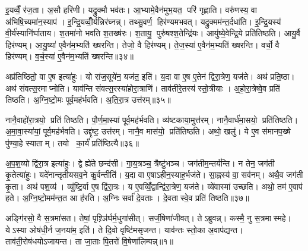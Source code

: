 इ॒यव्वैँ॒ र॑ज॒ता। अ॒सौ हरि॑णी। यद्रु॒क्मौ भव॑तः। आ॒भ्यामे॒वैन॑मुभ॒यत॒ परि॑ गृह्णाति। वरु॑णस्य॒ वा अ॑भिषि॒च्यमा॑न॒स्याप॑। इ॒न्द्रि॒यव्वीँ॒र्य॑न्निर॑घ्नन्न्। तथ्सु॒वर्ण॒ हिर॑ण्यमभवत्। यद्रु॒क्मम॑न्त॒र्दधा॑ति। इ॒न्द्रि॒यस्य॑ वी॒र्य॑स्यानि॑र्घाताय। श॒तमा॑नो भवति श॒तख्ष॑रः। श॒तायु॒ पुरु॑षश्श॒तेन्द्रि॑यः। आयु॑ष्ये॒वेन्द्रि॒ये प्रति॑तिष्ठति। आयु॒र्वै हिर॑ण्यम्। आ॒यु॒ष्या॑ ए॒वैन॑म॒भ्यति॑ ख्षरन्ति। तेजो॒ वै हिर॑ण्यम्। ते॒ज॒स्या॑ ए॒वैन॑म॒भ्यति॑ ख्षरन्ति। वर्चो॒ वै हिर॑ण्यम्। व॒र्च॒स्या॑ ए॒वैन॑म॒भ्यति॑ ख्षरन्ति॥३४॥\anuvakamend[श॒तख्ष॑रो॒ऽष्टौ च॑]

अप्र॑तिष्ठितो॒ वा ए॒ष इत्या॑हुः। यो रा॑ज॒सूये॑न॒ यज॑त॒ इति॑। य॒दा वा ए॒ष ए॒तेन॑ द्विरा॒त्रेण॒ यज॑ते। अथ॑ प्रति॒ष्ठा। अथ॑ संवत्स॒रमाप्नोति। याव॑न्ति संवत्स॒रस्या॑होरा॒त्राणि॑। ताव॑तीरे॒तस्य॑ स्तो॒त्रीयाः। अ॒हो॒रा॒त्रेष्वे॒व प्रति॑ तिष्ठति। अ॒ग्नि॒ष्टो॒मः पूर्व॒मह॑र्भवति। अ॒ति॒रा॒त्र उत्त॑रम्॥३५॥

नानै॒वाहो॑रा॒त्रयो॒ प्रति॑ तिष्ठति। पौ॒र्ण॒मा॒स्यां पूर्व॒मह॑र्भवति। व्य॑ष्टकाया॒मुत्त॑रम्। नानै॒वार्ध॑मा॒सयो॒ प्रति॑तिष्ठति। अ॒मा॒वा॒स्या॑यां॒ पूर्व॒मह॑र्भवति। उद्दृ॑ष्ट॒ उत्त॑रम्। नानै॒व मास॑यो॒ प्रति॑तिष्ठति। अथो॒ खलु॑। ये ए॒व स॑मानप॒ख्षे पु॑ण्या॒हे स्याताम्। तयो का॒र्यं॑ प्रति॑ष्ठित्यै॥३६॥

अ॒प॒श॒व्यो द्वि॑रा॒त्र इत्या॑हुः। द्वे ह्ये॑ते छन्द॑सी। गा॒य॒त्रञ्च॒ त्रैष्टु॑भञ्च। जग॑तीम॒न्तर्य॑न्ति। न तेन॒ जग॑ती कृ॒तेत्या॑हुः। यदे॑नान्तृतीयसव॒ने कु॒र्वन्तीति॑। य॒दा वा ए॒षाऽहीन॒स्याह॒र्भज॑ते। सा॒ह्नस्य॑ वा॒ सव॑नम्। अथै॒व जग॑ती कृ॒ता। अथ॑ पश॒व्य॑। व्यु॑ष्टि॒र्वा ए॒ष द्वि॑रा॒त्रः। य ए॒वव्विँ॒द्वान्द्वि॑रा॒त्रेण॒ यज॑ते। व्ये॑वास्मा॑ उच्छति। अथो॒ तम॑ ए॒वाप॑ हते। अ॒ग्नि॒ष्टो॒मम॑न्त॒त आ ह॑रति। अ॒ग्निः सर्वा॑ दे॒वताः। दे॒वतास्वे॒व प्रति॑ तिष्ठति॥३७॥

\clearpage
{}



\setcounter{anuvakam}{0}
अङ्गि॑रसो॒ वै स॒त्रमा॑सत। तेषां॒ पृश़्ञि॑र्घर्म॒धुगा॑सीत्। सर्जी॒षेणा॑जीवत्। तेऽब्रुवन्न्। कस्मै॒ नु स॒त्रमास्महे। येऽस्या ओष॑धी॒र्न ज॒नया॑म॒ इति॑। ते दि॒वो वृष्टि॑मसृजन्त। याव॑न्तः स्तो॒का अ॒वाप॑द्यन्त। ताव॑ती॒रोष॑धयोऽजायन्त। ता जा॒ताः पि॒तरो॑ वि॒षेणा॑लिम्पन्न्॥१॥

